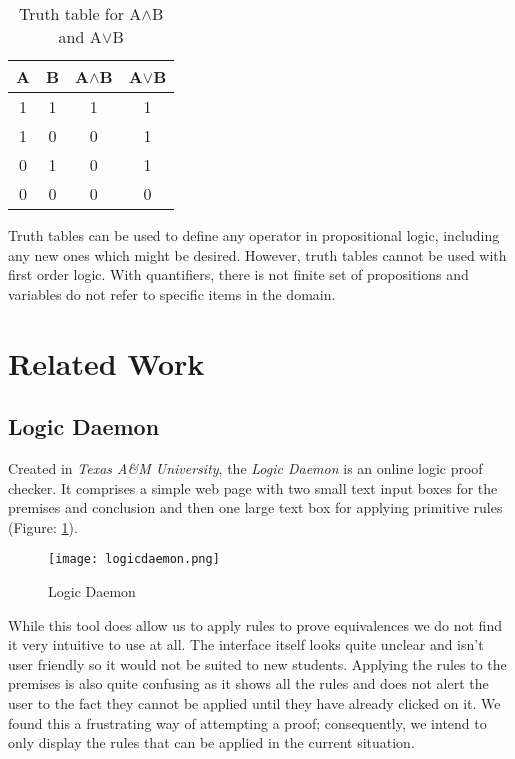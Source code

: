 \documentclass{report}
\begin{document}
\vspace{5 mm}
\begin{table}[ht]
\begin{center}
  \begin{tabular}{ | c | c || c | c | }
    \hline
    A & B & A$\land$B & A$\lor$B \\ \hline
    1 & 1 & 1 & 1 \\
    1 & 0 & 0 & 1\\
    0 & 1 & 0 & 1 \\
    0 & 0 & 0 & 0 \\
    \hline
  \end{tabular}
\caption{Truth table for A$\land$B and A$\lor$B}
\label{table:a_and_b_truth_table}
\end{center}
\end{table}
\vspace{5 mm}

Truth tables can be used to define any operator in propositional logic, including any new ones which might be desired. However, truth tables cannot be used with first order logic. With quantifiers, there is not finite set of propositions and variables do not refer to specific items in the domain.

\section{Related Work}
\label{sec:related_work}

\subsection{Logic Daemon}

Created in \emph{Texas A\&M University}, the \emph{Logic Daemon}\cite{logicdaemon} is an online logic proof checker. It comprises a simple web page with two small text input boxes for the premises and conclusion and then one large text box for applying primitive rules (Figure: \ref{logicdaemon}).

\begin{figure}[ht]
    \centering
    \texttt{[image: logicdaemon.png]}
    \caption{Logic Daemon}
    \label{logicdaemon}
\end{figure}

While this tool does allow us to apply rules to prove equivalences we do not find it very intuitive to use at all. The interface itself looks quite unclear and isn't user friendly so it would not be suited to new students. Applying the rules to the premises is also quite confusing as it shows all the rules and does not alert the user to the fact they cannot be applied until they have already clicked on it. We found this a frustrating way of attempting a proof; consequently, we intend to only display the rules that can be applied in the current situation.
\end{document}
